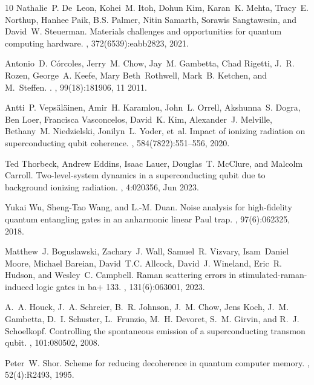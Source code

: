 \documentclass{article}
\begin{document}
\begin{thebibliography}{10}
	Nathalie~P. De~Leon, Kohei~M. Itoh, Dohun Kim, Karan~K. Mehta, Tracy~E.
	Northup, Hanhee Paik, B.S. Palmer, Nitin Samarth, Sorawis Sangtawesin, and
	David~W. Steuerman.
	\newblock Materials challenges and opportunities for quantum computing
	hardware.
	, 372(6539):eabb2823, 2021.
	
	Antonio~D. Córcoles, Jerry~M. Chow, Jay~M. Gambetta, Chad Rigetti, J.~R.
	Rozen, George~A. Keefe, Mary Beth~Rothwell, Mark~B. Ketchen, and M.~Steffen.
	.
	, 99(18):181906, 11 2011.
	
	Antti~P. Veps{\"a}l{\"a}inen, Amir~H. Karamlou, John~L. Orrell, Akshunna~S.
	Dogra, Ben Loer, Francisca Vasconcelos, David~K. Kim, Alexander~J. Melville,
	Bethany~M. Niedzielski, Jonilyn~L. Yoder, et~al.
	\newblock Impact of ionizing radiation on superconducting qubit coherence.
	, 584(7822):551--556, 2020.
	
	Ted Thorbeck, Andrew Eddins, Isaac Lauer, Douglas~T. McClure, and Malcolm
	Carroll.
	\newblock Two-level-system dynamics in a superconducting qubit due to
	background ionizing radiation.
	, 4:020356, Jun 2023.
	
	Yukai Wu, Sheng-Tao Wang, and L.-M. Duan.
	\newblock Noise analysis for high-fidelity quantum entangling gates in an
	anharmonic linear {P}aul trap.
	, 97(6):062325, 2018.
	
	Matthew~J. Boguslawski, Zachary~J. Wall, Samuel~R. Vizvary, Isam~Daniel Moore,
	Michael Bareian, David~T.C. Allcock, David~J. Wineland, Eric~R. Hudson, and
	Wesley~C. Campbell.
	\newblock Raman scattering errors in stimulated-raman-induced logic gates in
	ba+ 133.
	, 131(6):063001, 2023.
	
	A.~A. Houck, J.~A. Schreier, B.~R. Johnson, J.~M. Chow, Jens Koch, J.~M.
	Gambetta, D.~I. Schuster, L.~Frunzio, M.~H. Devoret, S.~M. Girvin, and R.~J.
	Schoelkopf.
	\newblock Controlling the spontaneous emission of a superconducting transmon
	qubit.
	, 101:080502, 2008.
	
	Peter~W. Shor.
	\newblock Scheme for reducing decoherence in quantum computer memory.
	, 52(4):R2493, 1995.
	

\end{thebibliography}
\end{document}
